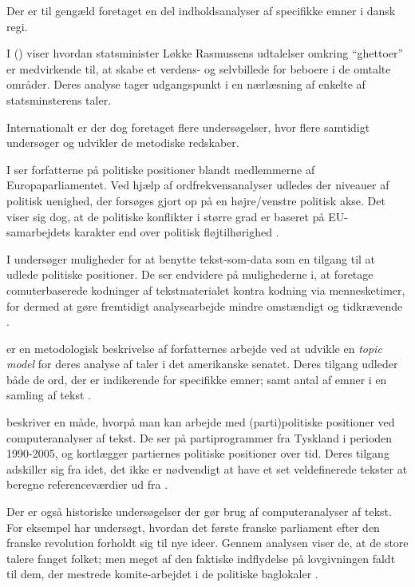 {Der er til gengæld foretaget en del indholdsanalyser af specifikke emner i dansk regi.

I  (\citeyear{andersenTaenkIkkePa2012}) viser \citeauthor{andersenTaenkIkkePa2012} hvordan statsminister Løkke Rasmussens udtalelser omkring “ghettoer” er medvirkende til, at skabe et verdens- og selvbillede for beboere i de omtalte områder.
Deres analyse tager udgangspunkt i en nærlæsning af enkelte af statsminsterens taler.

Internationalt er der dog foretaget flere undersøgelser, hvor flere samtidigt undersøger og udvikler de metodiske redskaber.

I  ser forfatterne på politiske positioner blandt medlemmerne af Europaparliamentet.
Ved hjælp af ordfrekvensanalyser udledes der niveauer af politisk uenighed, der forsøges gjort op på en højre/venstre politisk akse.
Det viser sig dog, at de politiske konflikter i større grad er baseret på EU-samarbejdets karakter end over politisk fløjtilhørighed \autocite{prokschPositionTakingEuropean2010}.

I  undersøger \citeauthor{laverExtractingPolicyPositions2003} muligheder for at benytte tekst-som-data som en tilgang til at udlede politiske positioner.
De ser endvidere på mulighederne i, at foretage comuterbaserede kodninger af tekstmaterialet kontra kodning via mennesketimer, for dermed at gøre fremtidigt analysearbejde mindre omstændigt og tidkrævende \autocite{laverExtractingPolicyPositions2003}.

 er en metodologisk beskrivelse af forfatternes arbejde ved at udvikle en \textit{topic model} for deres analyse af taler i det amerikanske senatet.
Deres tilgang udleder både de ord, der er indikerende for specifikke emner; samt antal af emner i en samling af tekst \autocite{quinnHowAnalyzePolitical2010}.

\citeauthor{slapinScalingModelEstimating2008} beskriver en måde, hvorpå man kan arbejde med (parti)politiske positioner ved computeranalyser af tekst.
De ser på partiprogrammer fra Tyskland i perioden 1990-2005, og kortlægger partiernes politiske positioner over tid.
Deres tilgang adskiller sig fra \citeauthor{laverExtractingPolicyPositions2003} idet, det ikke er nødvendigt at have et set veldefinerede tekster at beregne referenceværdier ud fra \autocite{slapinScalingModelEstimating2008}.

Der er også historiske undersøgelser der gør brug af computeranalyser af tekst.
For eksempel har \citeauthor{barronIndividualsInstitutionsInnovation2018} undersøgt, hvordan det første franske parliament efter den franske revolution forholdt sig til nye ideer.
Gennem analysen viser de, at de store talere fanget folket; men meget af den faktiske indflydelse på lovgivningen faldt til dem, der mestrede komite-arbejdet i de politiske baglokaler \autocite{barronIndividualsInstitutionsInnovation2018}. 

}
